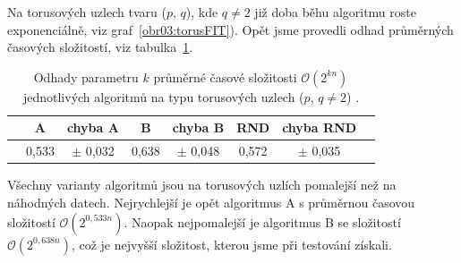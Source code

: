 Na torusových uzlech tvaru ($p$, $q$), kde $q\neq 2$ již doba běhu algoritmu roste exponenciálně, viz graf~\ref{obr03:torusFIT}). Opět jsme provedli odhad průměrných časových složitostí, viz tabulka~\ref{torustab}.

\begin{table}[b]
\centering
  \begin{tabular}{*{8}{c}}
    \toprule
       & A & chyba A & B & chyba B &  RND & chyba RND \\ 
    \midrule
      & 0,533 & $\pm$ 0,032  &   0,638 & $\pm$ 0,048   &  0,572 & $\pm$ 0,035\\
    \bottomrule
  \end{tabular}
    \caption{Odhady parametru $k$ průměrné časové složitosti $\mathcal{O}(2^{kn})$ jednotlivých algoritmů na typu torusových uzlech ($p$, $q\neq 2$) .} \label{torustab}
    
\end{table}

Všechny varianty algoritmů jsou na torusových uzlích pomalejší než na náhodných datech. Nejrychlejší je opět algoritmus A s průměrnou časovou složitostí $\mathcal{O}(2^{0,533 n})$. Naopak nejpomalejší je algoritmus B se složitostí $\mathcal{O}(2^{0,638 n})$, což je nejvyšší složitost, kterou jsme při testování získali.
